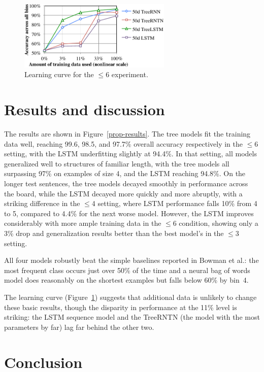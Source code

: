 \begin{figure}[t]
  \centering
      \includegraphics[height=1.3in]{lcc.pdf}
  \caption{Learning curve for the $\le$6 experiment.}
  \label{fig:lc} 
\end{figure}

\section{Results and discussion}\label{sec:discussion}

The results are shown in Figure~\ref{prop-results}. 
The tree models fit the training data well, reaching 99.6, 98.5, and 97.7\% overall accuracy respectively in the $\le$6 setting, with the LSTM underfitting slightly at 94.4\%. 
In that setting, all models generalized well to structures of familiar length, with the tree models all surpassing 97\% on examples of size 4, and the LSTM reaching 94.8\%.
On the longer test sentences, the tree models decayed smoothly in performance across the board, while the LSTM decayed more quickly and more abruptly, with a striking difference in the $\le$4 setting, where LSTM performance falls 10\% from 4 to 5, compared to 4.4\% for the next worse model. However, the LSTM improves considerably with more ample training data in the $\le$6 condition, showing only a 3\% drop and generalization results better than the best model's in the $\le$3 setting.

All four models robustly beat the simple baselines reported in Bowman et al.: the most frequent class occurs just over 50\% of the time and a neural bag of words model does reasonably on the shortest examples but falls below 60\% by bin~4.

The learning curve (Figure~\ref{fig:lc}) suggests that additional data is unlikely to change these basic results, though the disparity in performance at the 11\% level is striking: the LSTM sequence model and the TreeRNTN (the model with the most parameters by far) lag far behind the other two.

\section{Conclusion}

